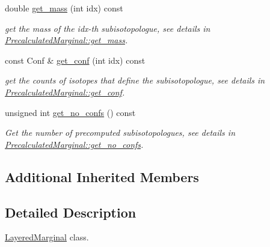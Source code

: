 \begin{DoxyCompactItemize}
\mbox{\label{class_iso_spec_1_1_layered_marginal_a0323521e0435172c1f4a4ccd0168668d}} 
double \mbox{\hyperlink{class_iso_spec_1_1_layered_marginal_a0323521e0435172c1f4a4ccd0168668d}{get\+\_\+mass}} (int idx) const
\begin{DoxyCompactList}\small\item\em get the mass of the idx-\/th subisotopologue, see details in \mbox{\hyperlink{class_iso_spec_1_1_precalculated_marginal_ada12caa2e195c1a16c5158a428ea3ed2}{Precalculated\+Marginal\+::get\+\_\+mass}}. \end{DoxyCompactList}\item 
\mbox{\label{class_iso_spec_1_1_layered_marginal_abfb6c79d8bdcf4b50f8942f7f8a21de5}} 
const Conf \& \mbox{\hyperlink{class_iso_spec_1_1_layered_marginal_abfb6c79d8bdcf4b50f8942f7f8a21de5}{get\+\_\+conf}} (int idx) const
\begin{DoxyCompactList}\small\item\em get the counts of isotopes that define the subisotopologue, see details in \mbox{\hyperlink{class_iso_spec_1_1_precalculated_marginal_a3ecbbf1263a274cc8e3bc71cd96f0bff}{Precalculated\+Marginal\+::get\+\_\+conf}}. \end{DoxyCompactList}\item 
\mbox{\label{class_iso_spec_1_1_layered_marginal_aa15967c22941783e5e59f20544434fb1}} 
unsigned int \mbox{\hyperlink{class_iso_spec_1_1_layered_marginal_aa15967c22941783e5e59f20544434fb1}{get\+\_\+no\+\_\+confs}} () const
\begin{DoxyCompactList}\small\item\em Get the number of precomputed subisotopologues, see details in \mbox{\hyperlink{class_iso_spec_1_1_precalculated_marginal_a0dbf1ec53eac9953a354c11e1b0803f9}{Precalculated\+Marginal\+::get\+\_\+no\+\_\+confs}}. \end{DoxyCompactList}\end{DoxyCompactItemize}
\subsection*{Additional Inherited Members}


\subsection{Detailed Description}
\mbox{\hyperlink{class_iso_spec_1_1_layered_marginal}{Layered\+Marginal}} class. 

